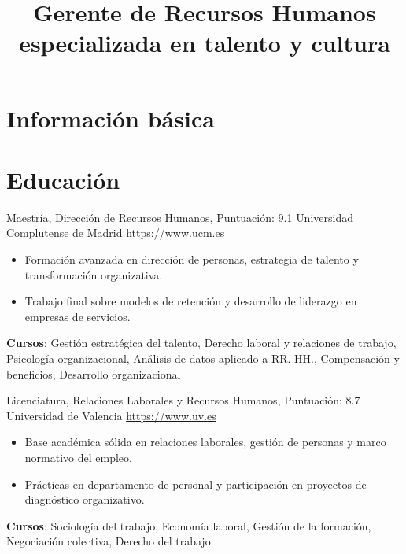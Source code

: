 \documentclass[a4paper, serif, 10pt]{moderncv}
\title{Gerente de Recursos Humanos especializada en talento y cultura}
\begin{document}
\maketitle

\section{Información básica}

\section{Educación}

        {Maestría, Dirección de Recursos Humanos, Puntuación: 9.1}
        {Universidad Complutense de Madrid}
        {\url{https://www.ucm.es}}
        {}
        {\begin{itemize}
\item Formación avanzada en dirección de personas, estrategia de talento y transformación organizativa.
\item Trabajo final sobre modelos de retención y desarrollo de liderazgo en empresas de servicios.
\end{itemize}
\textbf{Cursos}: Gestión estratégica del talento, Derecho laboral y relaciones de trabajo, Psicología organizacional, Análisis de datos aplicado a RR. HH., Compensación y beneficios, Desarrollo organizacional}

        {Licenciatura, Relaciones Laborales y Recursos Humanos, Puntuación: 8.7}
        {Universidad de Valencia}
        {\url{https://www.uv.es}}
        {}
        {\begin{itemize}
\item Base académica sólida en relaciones laborales, gestión de personas y marco normativo del empleo.
\item Prácticas en departamento de personal y participación en proyectos de diagnóstico organizativo.
\end{itemize}
\textbf{Cursos}: Sociología del trabajo, Economía laboral, Gestión de la formación, Negociación colectiva, Derecho del trabajo}
\end{document}
